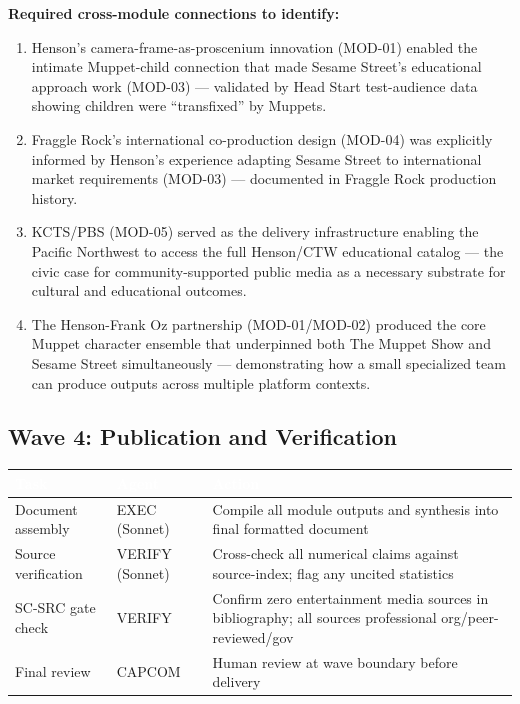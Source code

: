 \documentclass[11pt,letterpaper]{article}
\newcommand{\tableheader}[1]{\textbf{\sffamily\textcolor{white}{#1}}}
\begin{document}
\textbf{Required cross-module connections to identify:}
\begin{enumerate}[leftmargin=*]
  \item Henson's camera-frame-as-proscenium innovation (MOD-01) enabled the intimate Muppet-child connection that made Sesame Street's educational approach work (MOD-03) --- validated by Head Start test-audience data showing children were ``transfixed'' by Muppets.
  \item Fraggle Rock's international co-production design (MOD-04) was explicitly informed by Henson's experience adapting Sesame Street to international market requirements (MOD-03) --- documented in Fraggle Rock production history.
  \item KCTS/PBS (MOD-05) served as the delivery infrastructure enabling the Pacific Northwest to access the full Henson/CTW educational catalog --- the civic case for community-supported public media as a necessary substrate for cultural and educational outcomes.
  \item The Henson-Frank Oz partnership (MOD-01/MOD-02) produced the core Muppet character ensemble that underpinned both The Muppet Show and Sesame Street simultaneously --- demonstrating how a small specialized team can produce outputs across multiple platform contexts.
\end{enumerate}

\subsection{Wave 4: Publication and Verification}

\begin{center}
\begin{tabularx}{\textwidth}{L{3cm}L{2.5cm}X}
\toprule
{}
\tableheader{Task} & \tableheader{Agent} & \tableheader{Action} \\
\midrule
Document assembly & EXEC (Sonnet) & Compile all module outputs and synthesis into final formatted document \\
Source verification & VERIFY (Sonnet) & Cross-check all numerical claims against source-index; flag any uncited statistics \\
SC-SRC gate check & VERIFY & Confirm zero entertainment media sources in bibliography; all sources professional org/peer-reviewed/gov \\
Final review & CAPCOM & Human review at wave boundary before delivery \\
\bottomrule
\end{tabularx}
\end{center}
\end{document}
